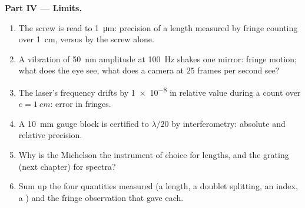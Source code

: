 \begin{problem}
\medskip
\noindent\textbf{Part IV --- Limits.}
\begin{enumerate}[resume]
  \item The screw is read to \qty{1}{\micro m}: precision of a length
        measured by fringe counting over \qty{1}{cm}, versus by the screw
        alone.
  \item A vibration of \qty{50}{nm} amplitude at \qty{100}{Hz} shakes one
        mirror: fringe motion; what does the eye see, what does a
        camera at $25$ frames per second see?
  \item The laser's frequency drifts by \qty{1e-8}{} in relative value
        during a count over $e = \qty{1}{cm}$: error in fringes.
  \item A \qty{10}{mm} gauge block is certified to $\lambda/20$ by
        interferometry: absolute and relative precision.
  \item Why is the Michelson the instrument of choice for lengths, and
        the grating (next chapter) for spectra?
  \item Sum up the four quantities measured (a length, a doublet
        splitting, an index, a ) and the fringe
        observation that gave each.
\end{enumerate}
\end{problem}
